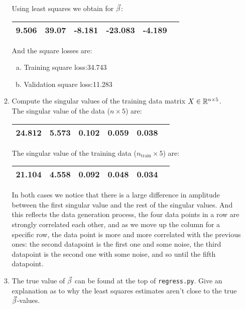 \documentclass[12pt,twoside]{article}
\begin{document}
\begin{enumerate}
\begin{enumerate}
   Using least squares we obtain for $\vec{\beta}$:
   \begin{center}
    		\begin{tabular}{ | c | c | c | c | c | c | }
		\hline
			9.506 & 39.07 & -8.181 & -23.083 &  -4.189\\ 
		\hline
    	\end{tabular}
    \end{center}
    And the square losses are:
    \begin{enumerate}[(a)]
	\item Training square loss:34.743
	\item Validation square loss:11.283
    \end{enumerate}

  \item Compute the singular values of the training data matrix
    $X\in\mathbb{R}^{n\times 5}$.\\
    
   The singular value of the data ($n \times 5$) are:
   \begin{center}
    		\begin{tabular}{ | c | c | c | c | c | c | }
		\hline
			24.812 & 5.573 & 0.102 & 0.059 & 0.038\\ 
		\hline
    	\end{tabular}
    \end{center}
    
   The singular value of the training data ($n_\text{train} \times 5$) are: 
   \begin{center}
    		\begin{tabular}{ | c | c | c | c | c | c | }
		\hline
			21.104 & 4.558 & 0.092 & 0.048 &  0.034\\ 
		\hline
    	\end{tabular}
    \end{center}

In both cases we notice that there is a large difference in amplitude between the first singular value and the rest of the singular values.
And this reflects the data generation process, the four data points in a row are strongly correlated each other, and as we move up the column for a specific row, 
the data point is more and more correlated with the previous ones:
the second datapoint is the first one and some noise, the third datapoint is the second one with some noise, and so until the fifth datapoint.

  \item The true value of $\vec{\beta}$ can be found at the top of
    \verb|regress.py|.  Give an explanation as to why the least squares
    estimates aren't close to the true $\vec{\beta}$-values.
    

\end{enumerate}
\end{enumerate}
\end{document}
